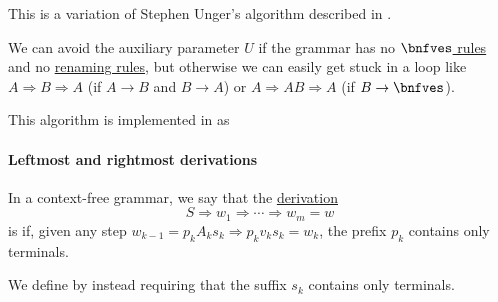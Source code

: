 \begin{comments}
  \item This is a variation of Stephen Unger's algorithm described in \cite{Unger1968Parser}.

  \item We can avoid the auxiliary parameter \( U \) if the grammar has no \hyperref[def:epsilon_free_grammar]{\( \bnfves \) rules} and no \hyperref[def:renaming_rule]{renaming rules}, but otherwise we can easily get stuck in a loop like \( A \Rightarrow B \Rightarrow A \) (if \( A \to B \) and \( B \to A \)) or \( A \Rightarrow AB \Rightarrow A \) (if \( B \to \bnfves \)).

  \item This algorithm is implemented in \cite{notebook:code} as
  \begin{CodeRefDisplay}
  \end{CodeRefDisplay}
\end{comments}

\paragraph{Leftmost and rightmost derivations}

\begin{definition}\label{def:leftmost_derivation}
  In a context-free grammar, we say that the \hyperref[def:formal_grammar/derivation]{derivation}
  \begin{equation*}
    S \Rightarrow w_1 \Rightarrow \cdots \Rightarrow w_m = w
  \end{equation*}
  is  if, given any step \( w_{k-1} = p_k A_k s_k \Rightarrow p_k v_k s_k = w_k \), the prefix \( p_k \) contains only terminals.

  We define  by instead requiring that the suffix \( s_k \) contains only terminals.
\end{definition}


